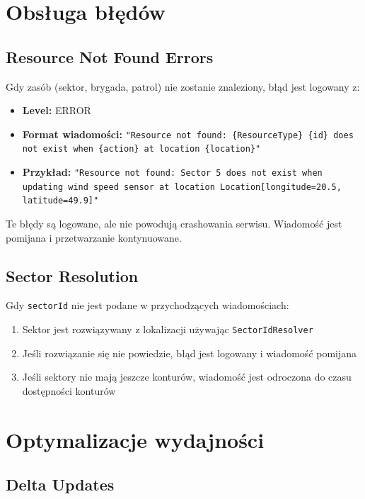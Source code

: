 \documentclass[11pt,a4paper] {article}
\begin{document}
\section{Obsługa błędów}

\subsection{Resource Not Found Errors}

Gdy zasób (sektor, brygada, patrol) nie zostanie znaleziony, błąd jest logowany z:
\begin{itemize}
    \item \textbf{Level:} ERROR
    \item \textbf{Format wiadomości:} \texttt{"Resource not found: \{ResourceType\} \{id\} does not exist when \{action\} at location \{location\}"}
    \item \textbf{Przykład:} \texttt{"Resource not found: Sector 5 does not exist when updating wind speed sensor at location Location[longitude=20.5, latitude=49.9]"}
\end{itemize}

Te błędy są logowane, ale nie powodują crashowania serwisu. Wiadomość jest pomijana i przetwarzanie kontynuowane.

\subsection{Sector Resolution}

Gdy \texttt{sectorId} nie jest podane w przychodzących wiadomościach:
\begin{enumerate}
    \item Sektor jest rozwiązywany z lokalizacji używając \texttt{SectorIdResolver}
    \item Jeśli rozwiązanie się nie powiedzie, błąd jest logowany i wiadomość pomijana
    \item Jeśli sektory nie mają jeszcze konturów, wiadomość jest odroczona do czasu dostępności konturów
\end{enumerate}

\section{Optymalizacje wydajności}

\subsection{Delta Updates}
\end{document}
